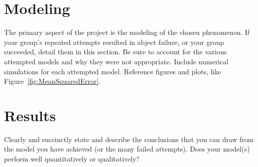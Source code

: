 \documentclass[11pt]{amsart}
\begin{document}



\section{Modeling}

 The primary aspect of the project is the modeling of the chosen phenomenon. If your group's repeated attempts resulted in abject failure, or your group succeeded, detail them in this section. Be sure to account for the various attempted models and why they were not appropriate. Include numerical simulations for each attempted model.  Reference figures and plots, like Figure~\ref{fig:MeanSquaredError}.


\section{Results}

Clearly and succinctly state and describe the conclusions that you can draw from the model you have achieved (or the many failed attempts). Does your model(s) perform well quantitatively or qualitatively?
\end{document}
